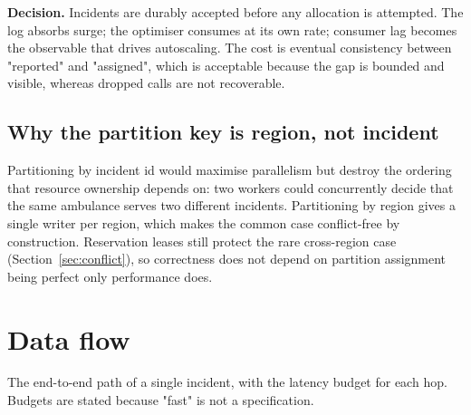\documentclass[11pt,a4paper]{article}
\begin{document}
\begin{keybox}
\textbf{Decision.} Incidents are durably accepted before any allocation is
attempted. The log absorbs surge; the optimiser consumes at its own rate;
consumer lag becomes the observable that drives autoscaling. The cost is
eventual consistency between "reported" and "assigned", which is acceptable
because the gap is bounded and visible, whereas dropped calls are not
recoverable.
\end{keybox}

\subsection{Why the partition key is region, not incident}

Partitioning by incident id would maximise parallelism but destroy the
ordering that resource ownership depends on: two workers could concurrently
decide that the same ambulance serves two different incidents. Partitioning by
region gives a single writer per region, which makes the common case
conflict-free by construction. Reservation leases still protect the rare
cross-region case (Section~\ref{sec:conflict}), so correctness does not depend
on partition assignment being perfect \textemdash{} only performance does.

\section{Data flow}

The end-to-end path of a single incident, with the latency budget for each
hop. Budgets are stated because "fast" is not a specification.
\end{document}
